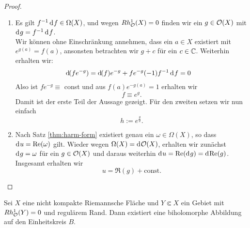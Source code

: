 \begin{proof}
  \begin{enumerate}
  \item Es gilt $f^{-1}\d[f] \in \Omega(X)$, und wegen $Rh^1_{\mathcal{O}}(X) = 0$
    finden wir ein $g \in \mathcal{O}(X)$ mit $\d[g] = f^{-1} \d[f]$.\\
    Wir können ohne Einschränkung annehmen, dass ein $a \in X$ existiert mit $ e^{g(a)} =
    f(a)$, ansonsten betrachten wir $g + c$ für ein $c \in \mathbb{C}$. Weiterhin erhalten wir:
    \begin{align*}
      \d[(f e^{-g})] & = \d[(f)] e^{-g} + f e^{-g} (-1) f^{-1}\d[f] = 0
    \end{align*}
    Also ist $fe^{-g} \equiv $ const und aus $f(a) e^{-g(a)} = 1$
    erhalten wir
    \[
    f \equiv e^g.
    \]
    Damit ist der erste Teil der Aussage gezeigt. Für den zweiten
    setzen wir nun einfach
    \[
    h := e^{\frac{g}{2}}.
    \]
  \item Nach Satz \ref{thm:harm-form} existiert genau ein $\omega \in \Omega(X)$, so dass $\d[u]
    = \Re(\omega)$
    gilt. Wieder wegen $\Omega(X) = \d[\hol(X)]$,
    erhalten wir zunächst $\d[g] = \omega$ für ein $g \in \mathcal{O}(X)$ und
    daraus weiterhin $\d[u] = \Re(\d[g])= \d[\Re(g)]$. Insgesamt erhalten wir
    \[
    u = \Re(g) + \text{const.}
    \]
  \end{enumerate}
\end{proof}

\begin{thm}
  \label{thm:Gebiet-Kreis}
  Sei $X$ eine nicht kompakte Riemannsche Fläche und $Y \Subset X$ ein
  Gebiet mit $Rh^1_{\mathcal{O}}(Y) = 0$ und regulärem Rand.
  Dann existiert eine biholomorphe Abbildung auf den Einheitskreis $B$.
\end{thm}


